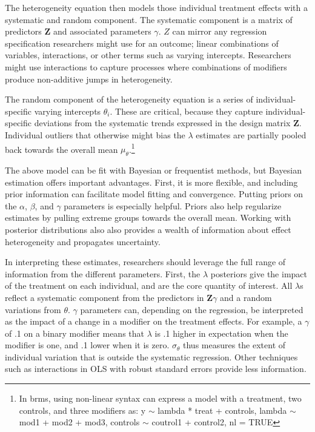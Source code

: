 \documentclass[12pt]{article}
\begin{document}
The heterogeneity equation then models those individual treatment effects with a systematic and random component. 
The systematic component is a matrix of predictors \textbf{Z} and associated parameters $\gamma$. 
$Z$ can mirror any regression specification researchers might use for an outcome; linear combinations of variables, interactions, or other terms such as varying intercepts. 
Researchers might use interactions to capture processes where combinations of modifiers produce non-additive jumps in heterogeneity. 


The random component of the heterogeneity equation is a series of individual-specific varying intercepts $\theta_i$.
These are critical, because they capture individual-specific deviations from the systematic trends expressed in the design matrix \textbf{Z}. 
Individual outliers that otherwise might bias the $\lambda$ estimates are partially pooled back towards the overall mean $\mu_\theta$.\footnote{In brms, using non-linear syntax can express a model with a treatment, two controls, and three modifiers as: y $\sim$ lambda * treat + controls, lambda $\sim$ mod1 + mod2 + mod3, controls $\sim$ coutrol1 + control2, nl = TRUE}


The above model can be fit with Bayesian or frequentist methods, but Bayesian estimation offers important advantages.
First, it is more flexible, and including prior information can facilitate model fitting and convergence. 
Putting priors on the $\alpha$, $\beta$, and $\gamma$ parameters is especially helpful.
Priors also help regularize estimates by pulling extreme groups towards the overall mean.
Working with posterior distributions also also provides a wealth of information about effect heterogeneity and propagates uncertainty.  


In interpreting these estimates, researchers should leverage the full range of information from the different parameters. 
First, the $\lambda$ posteriors give the impact of the treatment on each individual, and are the core quantity of interest. 
All $\lambda$s reflect a systematic component from the predictors in $\textbf{Z}\gamma$ and a random variations from $\theta$. 
$\gamma$ parameters can, depending on the regression, be interpreted as the impact of a change in a modifier on the treatment effects.
For example, a $\gamma$ of .1 on a binary modifier means that $\lambda$ is .1 higher in expectation when the modifier is one, and .1 lower when it is zero.
$\sigma_\theta$ thus measures the extent of individual variation that is outside the systematic regression. 
Other techniques such as interactions in OLS with robust standard errors provide less information.
\end{document}

